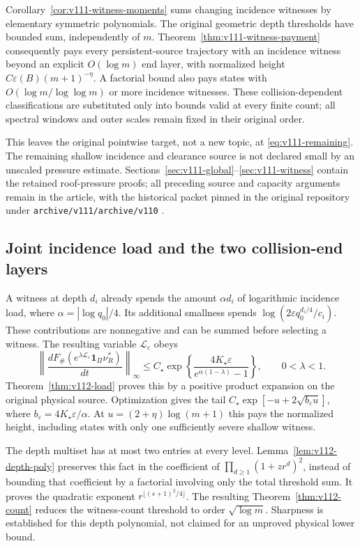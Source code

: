 \documentclass[11pt,reqno]{amsart}
\numberwithin{equation}{section}
\theoremstyle{definition}\newtheorem{definition}[theorem]{Definition}
\theoremstyle{remark}\newtheorem{remark}[theorem]{Remark}
\newcommand{\one}{\mathbf1}\newcommand{\dd}{\,\mathrm d}
\begin{document}
Corollary~\ref{cor:v111-witness-moments} sums changing incidence
witnesses by elementary symmetric polynomials. The original geometric
depth thresholds have bounded sum, independently of $m$.
Theorem~\ref{thm:v111-witness-payment} consequently pays every
persistent-source trajectory with an incidence witness beyond an
explicit $O(\log m)$ end layer, with normalized height
$C\varepsilon(B)(m+1)^{-\eta}$. A factorial bound also pays states
with $O(\log m/\log\log m)$ or more incidence witnesses. These
collision-dependent classifications are substituted only into bounds
valid at every finite count; all spectral windows and outer scales
remain fixed in their original order.

This leaves the original pointwise target, not a new topic, at
\eqref{eq:v111-remaining}. The remaining shallow incidence and
clearance source is not declared small by an unscaled pressure
estimate. Sections~\ref{sec:v111-global}--\ref{sec:v111-witness}
contain the retained roof-pressure proofs; all preceding source and capacity arguments
remain in the article, with the historical packet pinned in the original repository
under \texttt{archive/v111/archive/v110} \cite{Q110}.


\subsection*{Joint incidence load and the two collision-end layers}
A witness at depth $d_i$ already spends the amount
$\alpha d_i$ of logarithmic incidence load, where
$\alpha=|\log q_0|/4$. Its additional smallness spends
$\log(2\varepsilon q_0^{d_i/4}/c_i)$. These contributions are
nonnegative and can be summed before selecting a witness. The
resulting variable $\mathscr L_\varepsilon$ obeys
\[
 \left\|\frac{dF_\#(e^{\lambda\mathscr L_\varepsilon}
                               \one_\Pi\nu_R^*)}{dt}\right\|_\infty
 \le C_\star\exp\left\{\frac{4K_\star\varepsilon}
                                  {e^{\alpha(1-\lambda)}-1}\right\},
 \qquad 0<\lambda<1.
\]
Theorem~\ref{thm:v112-load} proves this by a positive product
expansion on the original physical source. Optimization gives the
tail $C_\star\exp[-u+2\sqrt{b_\varepsilon u}]$, where
$b_\varepsilon=4K_\star\varepsilon/\alpha$.
At $u=(2+\eta)\log(m+1)$ this pays the normalized height, including
states with only one sufficiently severe shallow witness.

The depth multiset has at most two entries at every level.
Lemma~\ref{lem:v112-depth-poly} preserves this fact in the
coefficient of $\prod_{d\ge1}(1+zr^d)^2$, instead of bounding that
coefficient by a factorial involving only the total threshold sum.
It proves the quadratic exponent
$r^{\lfloor(s+1)^2/4\rfloor}$. The resulting
Theorem~\ref{thm:v112-count} reduces the witness-count threshold to
order $\sqrt{\log m}$. Sharpness is established for this depth
polynomial, not claimed for an unproved physical lower bound.
\end{document}
